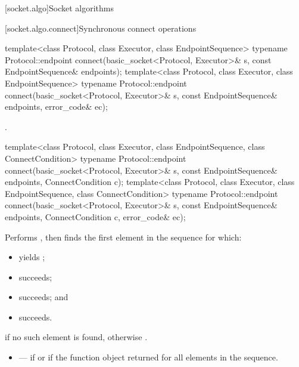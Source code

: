 
[socket.algo]{Socket algorithms}


[socket.algo.connect]{Synchronous connect operations}

\begin{itemdecl}
template<class Protocol, class Executor, class EndpointSequence>
  typename Protocol::endpoint connect(basic_socket<Protocol, Executor>& s,
                                      const EndpointSequence& endpoints);
template<class Protocol, class Executor, class EndpointSequence>
  typename Protocol::endpoint connect(basic_socket<Protocol, Executor>& s,
                                      const EndpointSequence& endpoints,
                                      error_code& ec);
\end{itemdecl}

\begin{itemdescr}
\pnum
\returns {}.
\end{itemdescr}

\begin{itemdecl}
template<class Protocol, class Executor, class EndpointSequence, class ConnectCondition>
  typename Protocol::endpoint connect(basic_socket<Protocol, Executor>& s,
                                      const EndpointSequence& endpoints,
                                      ConnectCondition c);
template<class Protocol, class Executor, class EndpointSequence, class ConnectCondition>
  typename Protocol::endpoint connect(basic_socket<Protocol, Executor>& s,
                                      const EndpointSequence& endpoints,
                                      ConnectCondition c, error_code& ec);
\end{itemdecl}

\begin{itemdescr}
\pnum
\effects Performs , then finds the first element  in the sequence  for which:
\begin{itemize}
\item
{} yields ;
\item
{} succeeds;
\item
{} succeeds; and
\item
{} succeeds.
\end{itemize}

\pnum
\returns {} if no such element is found, otherwise .

\pnum
\errors
\begin{itemize}
\item
{} --- if  or if the function object  returned  for all elements in the sequence.
\end{itemize}
\end{itemdescr}

